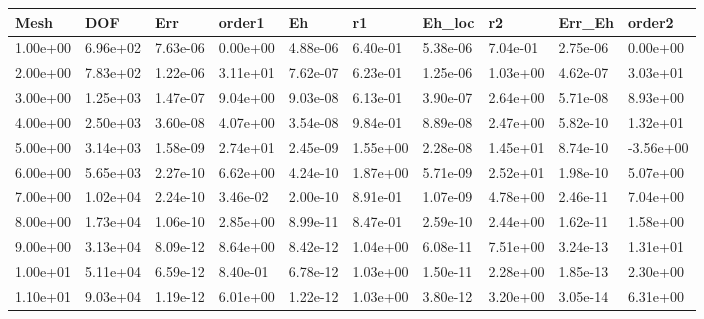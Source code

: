 \begin{tabular}{llllllllll}
Mesh & DOF & Err & order1 & Eh & r1 & Eh_loc & r2 & Err_Eh & order2 \\ 
\hline 
1.00e+00 & 6.96e+02 & 7.63e-06 & 0.00e+00 & 4.88e-06 & 6.40e-01 & 5.38e-06 & 7.04e-01 & 2.75e-06 &  0.00e+00 \\ 
2.00e+00 & 7.83e+02 & 1.22e-06 & 3.11e+01 & 7.62e-07 & 6.23e-01 & 1.25e-06 & 1.03e+00 & 4.62e-07 &  3.03e+01 \\ 
3.00e+00 & 1.25e+03 & 1.47e-07 & 9.04e+00 & 9.03e-08 & 6.13e-01 & 3.90e-07 & 2.64e+00 & 5.71e-08 &  8.93e+00 \\ 
4.00e+00 & 2.50e+03 & 3.60e-08 & 4.07e+00 & 3.54e-08 & 9.84e-01 & 8.89e-08 & 2.47e+00 & 5.82e-10 &  1.32e+01 \\ 
5.00e+00 & 3.14e+03 & 1.58e-09 & 2.74e+01 & 2.45e-09 & 1.55e+00 & 2.28e-08 & 1.45e+01 & 8.74e-10 & -3.56e+00 \\ 
6.00e+00 & 5.65e+03 & 2.27e-10 & 6.62e+00 & 4.24e-10 & 1.87e+00 & 5.71e-09 & 2.52e+01 & 1.98e-10 &  5.07e+00 \\ 
7.00e+00 & 1.02e+04 & 2.24e-10 & 3.46e-02 & 2.00e-10 & 8.91e-01 & 1.07e-09 & 4.78e+00 & 2.46e-11 &  7.04e+00 \\ 
8.00e+00 & 1.73e+04 & 1.06e-10 & 2.85e+00 & 8.99e-11 & 8.47e-01 & 2.59e-10 & 2.44e+00 & 1.62e-11 &  1.58e+00 \\ 
9.00e+00 & 3.13e+04 & 8.09e-12 & 8.64e+00 & 8.42e-12 & 1.04e+00 & 6.08e-11 & 7.51e+00 & 3.24e-13 &  1.31e+01 \\ 
1.00e+01 & 5.11e+04 & 6.59e-12 & 8.40e-01 & 6.78e-12 & 1.03e+00 & 1.50e-11 & 2.28e+00 & 1.85e-13 &  2.30e+00 \\ 
1.10e+01 & 9.03e+04 & 1.19e-12 & 6.01e+00 & 1.22e-12 & 1.03e+00 & 3.80e-12 & 3.20e+00 & 3.05e-14 &  6.31e+00 \\ 
\hline 
\end{tabular}